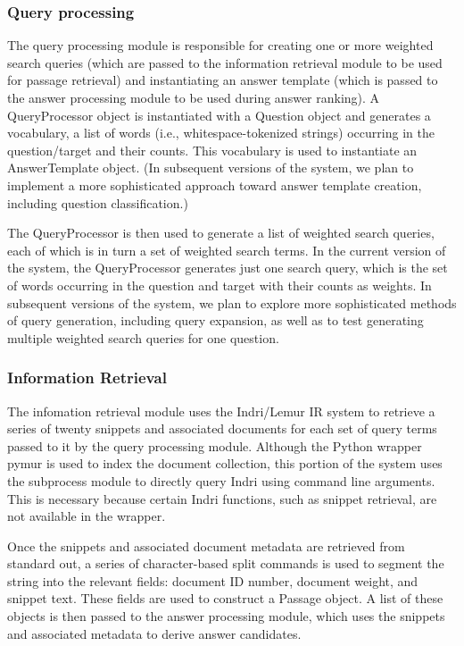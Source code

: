 \documentclass[11pt]{article}
\begin{document}
\subsubsection{Query processing}

The query processing module is responsible for creating one or more weighted search queries (which are passed to the information retrieval module to be used for passage retrieval) and instantiating an answer template (which is passed to the answer processing module to be used during answer ranking). A QueryProcessor object is instantiated with a Question object and generates a vocabulary, a list of words (i.e., whitespace-tokenized strings) occurring in the question/target and their counts. This vocabulary is used to instantiate an AnswerTemplate object. (In subsequent versions of the system, we plan to implement a more sophisticated approach toward answer template creation, including question classification.)

The QueryProcessor is then used to generate a list of weighted search queries, each of which is in turn a set of weighted search terms. In the current version of the system, the QueryProcessor generates just one search query, which is the set of words occurring in the question and target with their counts as weights. In subsequent versions of the system, we plan to explore more sophisticated methods of query generation, including query expansion, as well as to test generating multiple weighted search queries for one question.

\subsubsection{Information Retrieval}

The infomation retrieval module uses the Indri/Lemur IR system to retrieve a series of twenty snippets and associated documents for each set of query terms passed to it by the query processing module. Although the Python wrapper pymur is used to index the document collection, this portion of the system uses the subprocess module to directly query Indri using command line arguments. This is necessary because certain Indri functions, such as snippet retrieval, are not available in the wrapper. 

Once the snippets and associated document metadata are retrieved from standard out, a series of character-based split commands is used to segment the string into the relevant fields: document ID number, document weight, and snippet text. These fields are used to construct a Passage object. A list of these objects is then passed to the answer processing module, which uses the snippets and associated metadata to derive answer candidates.   
\end{document}
